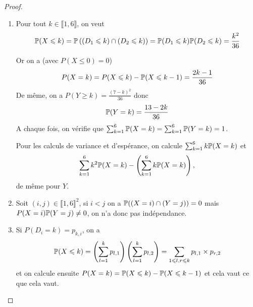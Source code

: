 \documentclass[12pt]{article}
\begin{document}
\begin{proof}
    \phantom{}
    \begin{enumerate}
        \item Pour tout $k\in\llbracket1,6\rrbracket$, on veut
        \begin{equation}
            \P(X\leqslant k)=\P\left(\left(D_{1}\leqslant k\right)\cap\left(D_{2}\leqslant k\right)\right)=\P(D_{1}\leqslant k)\P(D_{2}\leqslant k)=\frac{k^{2}}{36}
        \end{equation}

        Or on a (avec $P(X\leqslant 0)=0$)
        \begin{equation}
            P(X=k)=P(X\leqslant k)-\P(X\leqslant k-1)=\frac{2k-1}{36}
        \end{equation}
        De même, on a $P(Y\geqslant k)=\frac{(7-k)^{2}}{36}$ donc
        \begin{equation}
            \P(Y=k)=\frac{13-2k}{36}
        \end{equation}
        A chaque fois, on vérifie que $\sum_{k=1}^{6}\P(X=k)=\sum_{k=1}^{6}\P(Y=k)=1$.

        Pour les calculs de variance et d'espérance, on calcule $\sum_{k=1}^{6}k\P(X=k)$ et 
        \begin{equation*}
            \sum_{k=1}^{6}k^{2}\P(X=k)-\left(\sum_{k=1}^{6}k\P(X=k)\right),
        \end{equation*}de même pour $Y$.

        \item Soit $(i,j)\in\llbracket1,6\rrbracket^{2}$, si $i<j$ on a $\P((X=i)\cap (Y=j))=0$ mais $P(X=i)\P(Y=j)\neq0$, on n'a donc pas indépendance.
        
        \item Si $P(D_{i}=k)=p_{k,i}$, on a 
        \begin{equation}
            \P(X\leqslant k)=\left(\sum_{l=1}^{k}p_{l,1}\right)\left(\sum_{l=1}^{k}p_{l,2}\right)=\sum_{1\leqslant l,r\leqslant k}p_{l,1}\times p_{r,2}
        \end{equation}
        et on calcule ensuite $P(X=k)=\P(X\leqslant k)-\P(X\leqslant k-1)$ et cela vaut ce que cela vaut.
    \end{enumerate}
\end{proof}
\end{document}
